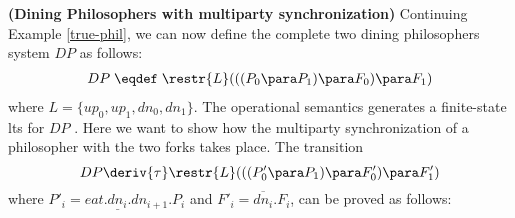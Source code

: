 \begin{example}\label{multi-sync-phil}{\bf (Dining Philosophers with multiparty synchronization)}
Continuing Example \ref{true-phil}, we can now define the complete two dining philosophers system $DP$
as follows:
\begin{eqnarray*}
DP \;  \eqdef \;  \restr{L}(((P_0\para P_1) \para F_0) \para F_1) 
\end{eqnarray*}
where $L = \{up_0, up_1, dn_0, dn_1\}$. The operational semantics generates a finite-state 
lts for $DP$
. Here we want to show how the 
multiparty synchronization of a philosopher with the two forks takes place.
The transition 
\[
DP \deriv{\tau}  \restr{L}(((P'_0\para P_1) \para F'_0) \para F'_1) 
\]
where $P'_i = eat.\underline{dn_i}.dn_{i+1}.P_i$ and $F'_i = \overline{dn_i}.F_i$,
can be proved as follows:



\begin{center}


\end{center}
\end{example}
